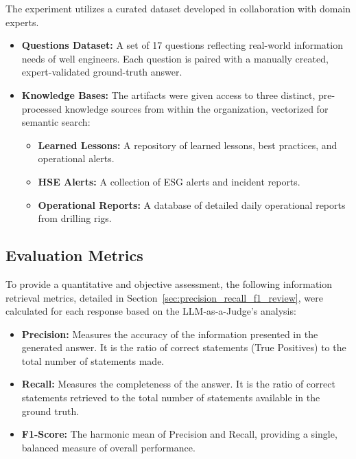        The experiment utilizes a curated dataset developed in collaboration with domain experts.
        \begin{itemize}
            \item \textbf{Questions Dataset:} A set of 17 questions reflecting real-world information needs of well engineers. Each question is paired with a manually created, expert-validated ground-truth answer.
            \item \textbf{Knowledge Bases:} The artifacts were given access to three distinct, pre-processed knowledge sources from within the organization, vectorized for semantic search:
            \begin{itemize}
                \item \textbf{Learned Lessons:} A repository of learned lessons, best practices, and operational alerts.
                \item \textbf{HSE Alerts:} A collection of ESG alerts and incident reports.
                \item \textbf{Operational Reports:} A database of detailed daily operational reports from drilling rigs.
            \end{itemize}
        \end{itemize}

    \subsection{Evaluation Metrics}

        To provide a quantitative and objective assessment, the following information retrieval metrics, detailed in Section~\ref{sec:precision_recall_f1_review}, were calculated for each response based on the LLM-as-a-Judge's analysis:
        \begin{itemize}
            \item \textbf{Precision:} Measures the accuracy of the information presented in the generated answer. It is the ratio of correct statements (True Positives) to the total number of statements made. 
            \item \textbf{Recall:} Measures the completeness of the answer. It is the ratio of correct statements retrieved to the total number of statements available in the ground truth.
            \item \textbf{F1-Score:} The harmonic mean of Precision and Recall, providing a single, balanced measure of overall performance.
        \end{itemize}

